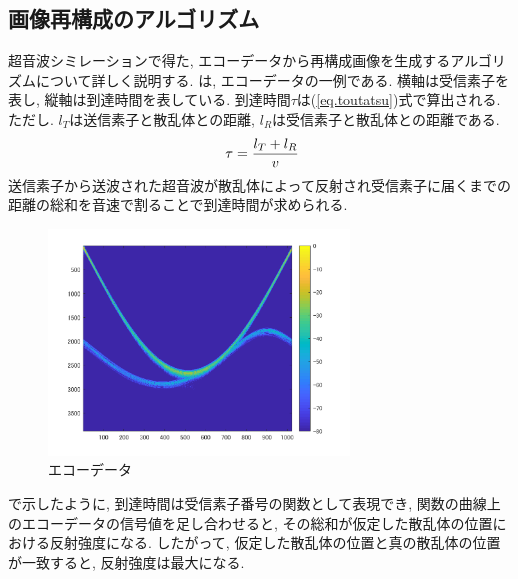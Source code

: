 \subsection{画像再構成のアルゴリズム}
超音波シミレーションで得た, エコーデータから再構成画像を生成するアルゴリズムについて詳しく説明する\cite{cure1}. は, エコーデータの一例である. 横軸は受信素子を表し, 縦軸は到達時間を表している. 到達時間$\tau$は(\ref{eq.toutatsu})式で算出される. ただし. $l_T$は送信素子と散乱体との距離, $l_R$は受信素子と散乱体との距離である. 
\begin{equation}
\label{eq.toutatsu}
\\\ \tau = \dfrac{l_T + l_R}{v}
\end{equation}
送信素子から送波された超音波が散乱体によって反射され受信素子に届くまでの距離の総和を音速で割ることで到達時間が求められる. 
 \begin{figure}[H]
  \begin{center}
    \includegraphics[width=80mm]{fig/echodata1soshi.pdf}
  \end{center}
  \caption{エコーデータ}
\end{figure}
で示したように, 到達時間は受信素子番号の関数として表現でき, 関数の曲線上のエコーデータの信号値を足し合わせると, その総和が仮定した散乱体の位置における反射強度になる. したがって, 仮定した散乱体の位置と真の散乱体の位置が一致すると, 反射強度は最大になる. 
